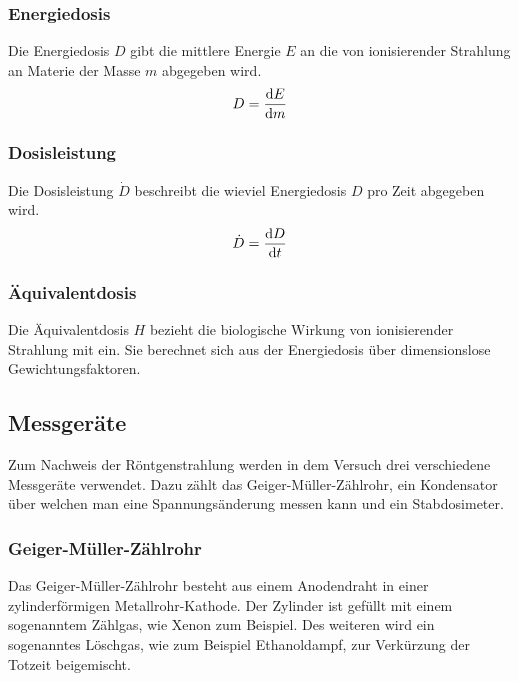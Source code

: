 \documentclass{article}
\begin{document}
\subsubsection{Energiedosis}
Die Energiedosis $D$ gibt die mittlere Energie $E$ an die von ionisierender Strahlung an Materie der Masse $m$ abgegeben wird.
\begin{displaymath}
    D = \dv{E}{m}
\end{displaymath}

\subsubsection{Dosisleistung}
Die Dosisleistung $\dot D$ beschreibt die wieviel Energiedosis $D$ pro Zeit abgegeben wird.
\begin{displaymath}
    \dot D = \dv{D}{t}
\end{displaymath}

\subsubsection{Äquivalentdosis}
Die Äquivalentdosis $H$ bezieht die biologische Wirkung von ionisierender Strahlung mit ein.
Sie berechnet sich aus der Energiedosis über dimensionslose Gewichtungsfaktoren.


\subsection{Messgeräte}

Zum Nachweis der Röntgenstrahlung werden in dem Versuch drei verschiedene Messgeräte verwendet. 
Dazu zählt das Geiger-Müller-Zählrohr, ein Kondensator über welchen man eine Spannungsänderung messen kann und ein Stabdosimeter.

\subsubsection{Geiger-Müller-Zählrohr}
Das Geiger-Müller-Zählrohr besteht aus einem Anodendraht in einer zylinderförmigen Metallrohr-Kathode.
Der Zylinder ist gefüllt mit einem sogenanntem Zählgas, wie Xenon zum Beispiel. 
Des weiteren wird ein sogenanntes Löschgas, wie zum Beispiel Ethanoldampf, zur Verkürzung der Totzeit beigemischt.
\end{document}
